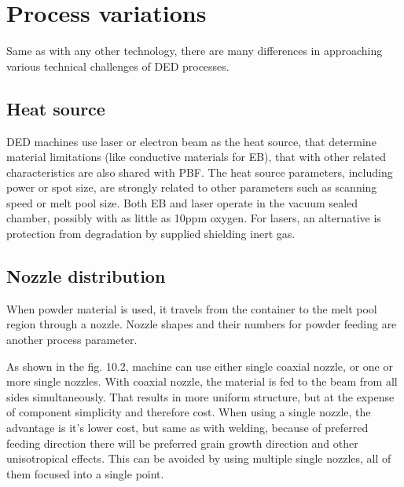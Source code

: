 \documentclass[a4paper, twoside, 11pt]{report}
\begin{document}
\section{Process variations}
Same as with any other technology, there are many differences in approaching various technical challenges of DED processes.


\subsection{Heat source}
DED machines use laser or electron beam as the heat source, that determine material limitations (like conductive materials for EB), that with other related characteristics are also shared with PBF. The heat source parameters, including power or spot size, are strongly related to other parameters such as scanning speed or melt pool size. Both EB and laser operate in the vacuum sealed chamber, possibly with as little as 10ppm oxygen\cite[p. 252]{AMT}. For lasers, an alternative is protection from degradation by supplied shielding inert gas. 
\subsection{Nozzle distribution}
When powder material is used, it travels from the container to the melt pool region through a nozzle. Nozzle shapes and their numbers for powder feeding are another process parameter.
	
	As shown in the fig. 10.2, machine can use either single coaxial nozzle, or one or more single nozzles. With coaxial nozzle, the material is fed to the beam from all sides simultaneously. That results in more uniform structure, but at the expense of component simplicity and therefore cost. When using a single nozzle, the advantage is it's lower cost, but same as with welding, because of preferred feeding direction there will be preferred grain growth direction and other unisotropical effects. This can be avoided by using multiple single nozzles, all of them focused into a single point.
\end{document}
